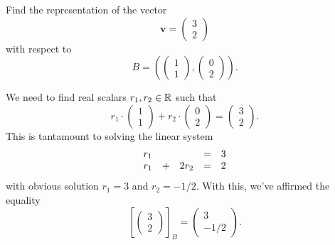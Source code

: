 \begin{problem}{}{}
 Find the representation of the vector
 \[
  \mathbf{v} = 
  \begin{pmatrix}
   3\\
   2
  \end{pmatrix}
 \]
 with respect to
 \[
  B = \left( 
   \begin{pmatrix}
    1\\
    1
   \end{pmatrix},
   \begin{pmatrix}
    0\\
    2
   \end{pmatrix}
  \right).
 \]
\end{problem}
\begin{probsol}
 We need to find real scalars $r_1,r_2 \in \mathbb{R}$ such that
 \[
  r_1 \cdot
  \begin{pmatrix}
   1\\
   1 
  \end{pmatrix} + r_2 \cdot
  \begin{pmatrix}
   0\\
   2
  \end{pmatrix}
  =
  \begin{pmatrix}
   3\\
   2
  \end{pmatrix}.
 \]
 This is tantamount to solving the linear system
 \[
  \begin{array}{r c r c l}
   r_1 & & & = & 3\\
   r_1 & + & 2r_2 & = & 2
  \end{array}
 \]
 with obvious solution $r_1 = 3$ and $r_2 = -1 / 2$. With this, we've affirmed
 the equality
 \[
  \left[ 
  \begin{pmatrix}
   3\\
   2
  \end{pmatrix}
  \right]_B =
  \begin{pmatrix}
   3\\
   -1 / 2
  \end{pmatrix}.
 \]
\end{probsol}
